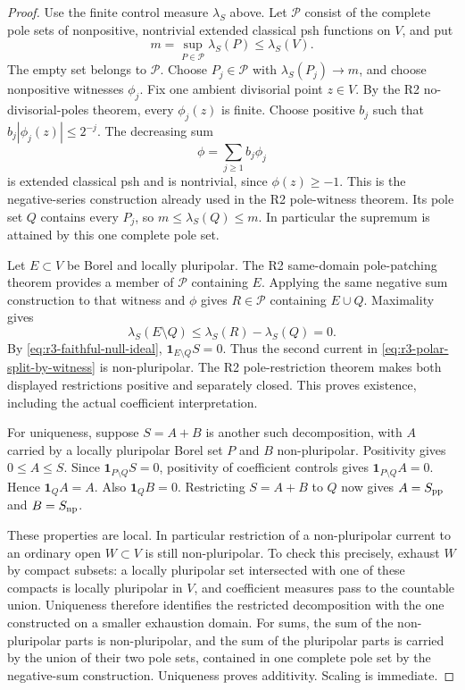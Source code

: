 \documentclass[11pt,a4paper]{article}
\numberwithin{equation}{section}
\theoremstyle{definition}
\theoremstyle{remark}
\begin{document}
\begin{proof}
Use the finite control measure $\lambda_S$ above. Let
$\mathscr P$ consist of the complete pole sets of nonpositive,
nontrivial extended classical psh functions on $V$, and put
\[
 m=\sup_{P\in\mathscr P}\lambda_S(P)\leq\lambda_S(V).
\]
The empty set belongs to $\mathscr P$. Choose $P_j\in\mathscr P$
with $\lambda_S(P_j)\to m$, and choose nonpositive witnesses
$\phi_j$. Fix one ambient divisorial point $z\in V$.
By the R2 no-divisorial-poles theorem, every $\phi_j(z)$ is
finite. Choose positive $b_j$ such that
$b_j|\phi_j(z)|\leq2^{-j}$. The decreasing sum
\[
 \phi=\sum_{j\geq1}b_j\phi_j
\]
is extended classical psh and is nontrivial, since
$\phi(z)\geq-1$. This is the negative-series construction
already used in the R2 pole-witness theorem. Its pole set
$Q$ contains every $P_j$, so
$m\leq\lambda_S(Q)\leq m$. In particular the supremum is
attained by this one complete pole set.

Let $E\subset V$ be Borel and locally pluripolar.
The R2 same-domain pole-patching theorem provides a member
of $\mathscr P$ containing $E$. Applying the same negative
sum construction to that witness and $\phi$ gives
$R\in\mathscr P$ containing $E\cup Q$. Maximality gives
\[
 \lambda_S(E\setminus Q)
       \leq\lambda_S(R)-\lambda_S(Q)=0.
\]
By \eqref{eq:r3-faithful-null-ideal},
$\mathbf1_{E\setminus Q}S=0$. Thus the second current in
\eqref{eq:r3-polar-split-by-witness} is non-pluripolar.
The R2 pole-restriction theorem makes both displayed
restrictions positive and separately closed. This proves
existence, including the actual coefficient interpretation.

For uniqueness, suppose $S=A+B$ is another such
decomposition, with $A$ carried by a locally pluripolar
Borel set $P$ and $B$ non-pluripolar. Positivity gives
$0\leq A\leq S$. Since
$\mathbf1_{P\setminus Q}S=0$, positivity of coefficient
controls gives $\mathbf1_{P\setminus Q}A=0$. Hence
$\mathbf1_Q A=A$. Also $\mathbf1_QB=0$. Restricting
$S=A+B$ to $Q$ now gives $A=S_{\rm pp}$ and
$B=S_{\rm np}$.

These properties are local. In particular restriction of
a non-pluripolar current to an ordinary open $W\subset V$
is still non-pluripolar. To check this precisely, exhaust
$W$ by compact subsets: a locally pluripolar set intersected
with one of these compacts is locally pluripolar in $V$,
and coefficient measures pass to the countable union.
Uniqueness therefore identifies the restricted decomposition
with the one constructed on a smaller exhaustion domain.
For sums, the sum of the non-pluripolar parts is
non-pluripolar, and the sum of the pluripolar parts is
carried by the union of their two pole sets, contained in
one complete pole set by the negative-sum construction.
Uniqueness proves additivity. Scaling is immediate.
\end{proof}
\end{document}
